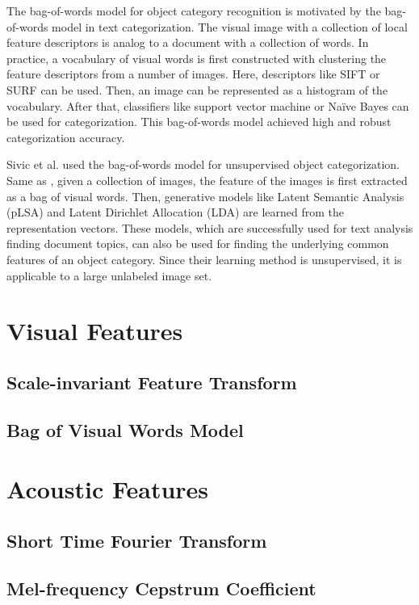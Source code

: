 \documentclass[12pt,final,twoside]{report}
\theoremstyle{plain}
\theoremstyle{definition}
\theoremstyle{remark}
\begin{document}
The bag-of-words model \cite{csurka_visual_2004} for object category recognition is motivated by the bag-of-words model in text categorization. The visual image with a collection of local feature descriptors is analog to a document with a collection of words. In practice, a vocabulary of visual words is first constructed with clustering the feature descriptors from a number of images. Here, descriptors like SIFT or SURF can be used. Then, an image can be represented as a histogram of the vocabulary. After that, classifiers like support vector machine or Na\"ive Bayes can be used for categorization. This bag-of-words model achieved high and robust categorization accuracy.

Sivic et al. \cite{sivic_discovering_2005} used the bag-of-words model for unsupervised object categorization. Same as \cite{csurka_visual_2004}, given a collection of images, the feature of the images is first extracted as a bag of visual words. Then, generative models like Latent Semantic Analysis (pLSA) and Latent Dirichlet Allocation (LDA) are learned from the representation vectors. These models, which are successfully used for text analysis finding document topics, can also be used for finding the underlying common features of an object category. Since their learning method is unsupervised, it is applicable to a large unlabeled image set.

\cleardoublepage
\chapter{Visual Features}
\section{Scale-invariant Feature Transform}
\section{Bag of Visual Words Model}

\cleardoublepage
\chapter{Acoustic Features}
\section{Short Time Fourier Transform}
\section{Mel-frequency Cepstrum Coefficient}
\end{document}
